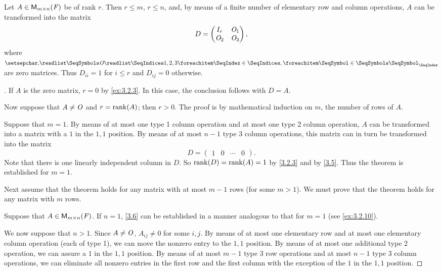 \begin{thm}\label{3.6}
  Let \(A \in \mathsf{M}_{{m} \times n}({\mathit{F}})\) be of rank \(r\).
  Then \(r \leq m\), \(r \leq n\), and, by means of a finite number of elementary row and column operations, \(A\) can be transformed into the matrix
  \[
    D = \begin{pmatrix}
      I_r   & \mathit{O}_1 \\
      \mathit{O}_2 & \mathit{O}_3
    \end{pmatrix},
  \]
  where \(\seq{\zm}{1,2,3}\) are zero matrices.
  Thus \(D_{i i} = 1\) for \(i \leq r\) and \(D_{i j} = 0\) otherwise.
\end{thm}

\begin{proof}[]
  If \(A\) is the zero matrix, \(r = 0\) by \cref{ex:3.2.3}.
  In this case, the conclusion follows with \(D = A\).

  Now suppose that \(A \neq \mathit{O}\) and \(r = \rk{A}\);
  then \(r > 0\).
  The proof is by mathematical induction on \(m\), the number of rows of \(A\).

  Suppose that \(m = 1\).
  By means of at most one type 1 column operation and at most one type 2 column operation, \(A\) can be transformed into a matrix with a \(1\) in the \(1,1\) position.
  By means of at most \(n - 1\) type 3 column operations, this matrix can in turn be transformed into the matrix
  \[
    D = \begin{pmatrix}
      1 & 0 & \cdots & 0
    \end{pmatrix}.
  \]
  Note that there is one linearly independent column in \(D\).
  So \(\rk{D} = \rk{A} = 1\) by \cref{3.2.3} and by \cref{3.5}.
  Thus the theorem is established for \(m = 1\).

  Next assume that the theorem holds for any matrix with at most \(m - 1\) rows (for some \(m > 1\)).
  We must prove that the theorem holds for any matrix with \(m\) rows.

  Suppose that \(A \in \mathsf{M}_{{m} \times n}({\mathit{F}})\).
  If \(n = 1\), \cref{3.6} can be established in a manner analogous to that for \(m = 1\)
  (see \cref{ex:3.2.10}).

  We now suppose that \(n > 1\).
  Since \(A \neq \mathit{O}\), \(A_{i j} \neq 0\) for some \(i, j\).
  By means of at most one elementary row and at most one elementary column operation (each of type 1), we can move the nonzero entry to the \(1,1\) position.
  By means of at most one additional type 2 operation, we can assure a \(1\) in the \(1,1\) position.
  By means of at most \(m - 1\) type 3 row operations and at most \(n - 1\) type 3 column operations, we can eliminate all nonzero entries in the first row and the first column with the exception of the \(1\) in the \(1,1\) position.


\end{proof}
